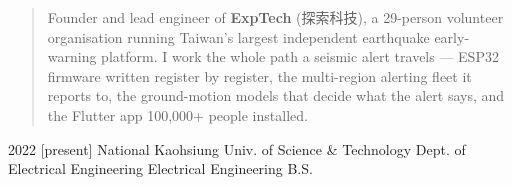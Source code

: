 \documentclass{resume}
\begin{document}
\makeheader

\begin{abstract}
Founder and lead engineer of \textbf{ExpTech} (探索科技), a 29-person volunteer organisation running
Taiwan's largest independent earthquake early-warning platform. I work the whole path a seismic alert
travels --- ESP32 firmware written register by register, the multi-region alerting fleet it reports to, the
ground-motion models that decide what the alert says, and the Flutter app 100,000+ people installed.
\end{abstract}

\begin{competences}[9em]
\end{competences}

\begin{educations}
  \education%
    {2022}%
    [present]%
    {National Kaohsiung Univ. of Science \& Technology}%
    {Dept. of Electrical Engineering}%
    {Electrical Engineering}%
    {B.S.}
\end{educations}
\end{document}
